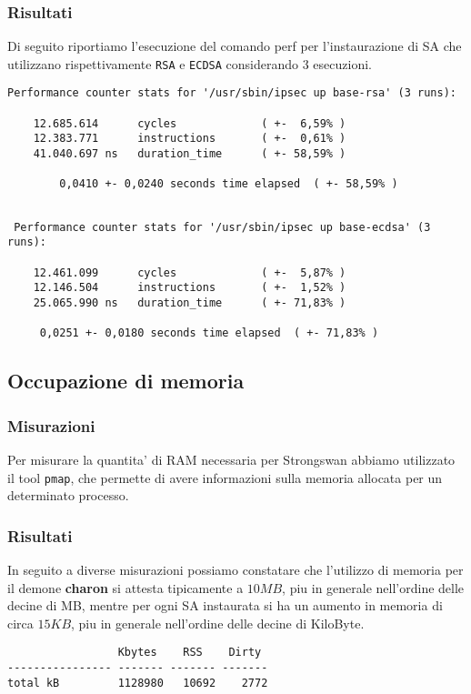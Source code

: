 \documentclass[
10pt, %
a4paper, %
oneside, %
headinclude,footinclude, %
BCOR5mm, %
]{scrartcl}
\begin{document}
\subsubsection{Risultati}

Di seguito riportiamo l'esecuzione del comando perf per l'instaurazione di SA che utilizzano rispettivamente \lstinline|RSA| e \lstinline|ECDSA| considerando 3 esecuzioni.
\vspace*{0.2cm}
\begin{lstlisting}
Performance counter stats for '/usr/sbin/ipsec up base-rsa' (3 runs):

    12.685.614      cycles             ( +-  6,59% )
    12.383.771      instructions       ( +-  0,61% )
    41.040.697 ns   duration_time      ( +- 58,59% )

        0,0410 +- 0,0240 seconds time elapsed  ( +- 58,59% )


\end{lstlisting}

\begin{lstlisting}
 Performance counter stats for '/usr/sbin/ipsec up base-ecdsa' (3 runs):

    12.461.099      cycles             ( +-  5,87% )
    12.146.504      instructions       ( +-  1,52% )
    25.065.990 ns   duration_time      ( +- 71,83% )

     0,0251 +- 0,0180 seconds time elapsed  ( +- 71,83% )

\end{lstlisting}

\subsection{Occupazione di memoria}

\subsubsection{Misurazioni}

Per misurare la quantita' di RAM necessaria per Strongswan abbiamo utilizzato il tool \lstinline|pmap|, che permette di avere informazioni sulla memoria allocata per un determinato processo.

\subsubsection{Risultati}

In seguito a diverse misurazioni possiamo constatare che l'utilizzo di memoria per il demone \textbf{charon} si attesta tipicamente a $10 MB$, piu in generale nell'ordine delle decine di MB, mentre per ogni SA instaurata si ha un aumento in memoria di circa $15 KB$, piu in generale nell'ordine delle decine di KiloByte. 
\vspace*{0.2cm}
\begin{lstlisting}
                 Kbytes    RSS    Dirty
---------------- ------- ------- ------- 
total kB         1128980   10692    2772

\end{lstlisting}
\newpage
\end{document}
